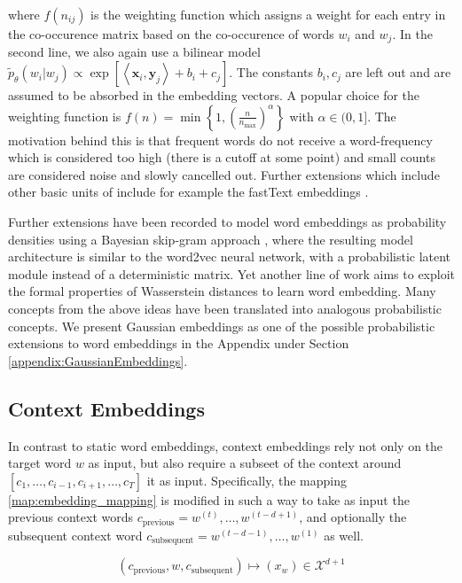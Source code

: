 \documentclass[a4paper,12pt,twoside,openright]{report}
\begin{document}
where $f(n_{ij})$ is the weighting function which assigns a weight for each entry in the co-occurence matrix based on the co-occurence of words $w_i$ and $w_j$. 
In the second line, we also again use a bilinear model $\tilde{p}_{\theta}\left(w_{i} | w_{j}\right) \propto \exp \left[\left\langle\mathbf{x}_{i}, \mathbf{y}_{j}\right\rangle+b_{i}+c_{j}\right]$.
The constants $b_i, c_j$ are left out and are assumed to be absorbed in the embedding vectors.
A popular choice for the weighting function is 
$
f(n) = \min \left\lbrace 1, \left(\frac{n}{n_{\max}}\right)^{\alpha} \right\rbrace
$
with $\alpha \in (0, 1]$.
The motivation behind this is that frequent words do not receive a word-frequency which is considered too high (there is a cutoff at some point) and small counts are considered noise and slowly cancelled out.
Further extensions which include other basic units of include for example the fastText embeddings \cite{bojanowski17}.

Further extensions have been recorded to model word embeddings as probability densities using a Bayesian skip-gram approach \cite{brazinskas19}, where the resulting model architecture is similar to the word2vec neural network, with a probabilistic latent module instead of a deterministic matrix.
Yet another line of work \cite{yan19} aims to exploit the formal properties of Wasserstein distances to learn word embedding.
Many concepts from the above ideas have been translated into analogous probabilistic concepts.
We present Gaussian embeddings as one of the possible probabilistic  extensions to word embeddings in the Appendix under Section \ref{appendix:GaussianEmbeddings}.

\newpage
\subsection{Context Embeddings}

In contrast to static word embeddings, context embeddings rely not only on the target word $w$ as input, but also require a subseet of the context around $[c_1, \ldots, c_{i-1}, c_{i+1}, \ldots, c_T]$ it as input.
Specifically, the mapping \eqref{map:embedding_mapping} is modified in such a way to take as input the previous context words $c_\text{previous} = w^{(t)}, \ldots, w^{(t-d + 1)}$, and optionally the subsequent context word $c_\text{subsequent} = w^{(t-d - 1)}, \ldots, w^{(1)}$ as well.

\begin{equation}
(c_\text{previous}, w, c_\text{subsequent}) \mapsto (x_w) \in \mathcal{X}^{d + 1}
\end{equation}{\label{map:context_embedding_mapping}}
\end{document}
